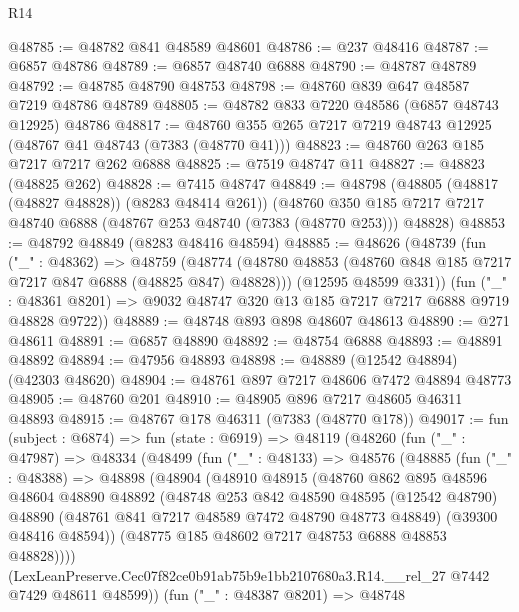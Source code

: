 \begin{lexlean}{R14}
\begin{coremodule}
@48785 := @48782 @841 @48589 @48601
@48786 := @237 @48416
@48787 := @6857 @48786
@48789 := @6857 @48740 @6888
@48790 := @48787 @48789
@48792 := @48785 @48790 @48753
@48798 := @48760 @839 @647 @48587 @7219 @48786 @48789
@48805 := @48782 @833 @7220 @48586 (@6857 @48743 @12925) @48786
@48817 := @48760 @355 @265 @7217 @7219 @48743 @12925 (@48767 @41 @48743 (@7383 (@48770 @41)))
@48823 := @48760 @263 @185 @7217 @7217 @262 @6888
@48825 := @7519 @48747 @11
@48827 := @48823 (@48825 @262)
@48828 := @7415 @48747
@48849 := @48798
    (@48805 (@48817 (@48827 @48828)) (@8283 @48414 @261))
    (@48760 @350 @185 @7217 @7217 @48740 @6888 (@48767 @253 @48740 (@7383 (@48770 @253))) @48828)
@48853 := @48792 @48849 (@8283 @48416 @48594)
@48885 := @48626
    (@48739
      (fun ("_" : @48362) =>
      @48759
        (@48774 (@48780 @48853 (@48760 @848 @185 @7217 @7217 @847 @6888 (@48825 @847) @48828)))
        (@12595 @48599 @331))
      (fun ("_" : @48361 @8201) => @9032 @48747 @320 @13 @185 @7217 @7217 @6888 @9719 @48828 @9722))
@48889 := @48748 @893 @898 @48607 @48613
@48890 := @271 @48611
@48891 := @6857 @48890
@48892 := @48754 @6888
@48893 := @48891 @48892
@48894 := @47956 @48893
@48898 := @48889 (@12542 @48894) (@42303 @48620)
@48904 := @48761 @897 @7217 @48606 @7472 @48894 @48773
@48905 := @48760 @201
@48910 := @48905 @896 @7217 @48605 @46311 @48893
@48915 := @48767 @178 @46311 (@7383 (@48770 @178))
@49017 := fun (subject : @6874) =>
  fun (state : @6919) =>
  @48119
    (@48260
      (fun ("_" : @47987) =>
      @48334
        (@48499
          (fun ("_" : @48133) =>
          @48576
            (@48885
              (fun ("_" : @48388) =>
              @48898
                (@48904
                  (@48910
                    @48915
                    (@48760
                      @862
                      @895
                      @48596
                      @48604
                      @48890
                      @48892
                      (@48748
                        @253
                        @842
                        @48590
                        @48595
                        (@12542 @48790)
                        @48890
                        (@48761 @841 @7217 @48589 @7472 @48790 @48773 @48849)
                        (@39300 @48416 @48594))
                      (@48775 @185 @48602 @7217 @48753 @6888 @48853 @48828))))
                (LexLeanPreserve.Cec07f82ce0b91ab75b9e1bb2107680a3.R14.__rel_27
                  @7442
                  @7429
                  @48611
                  @48599))
              (fun ("_" : @48387 @8201) =>
              @48748

\end{coremodule}
\end{lexlean}
